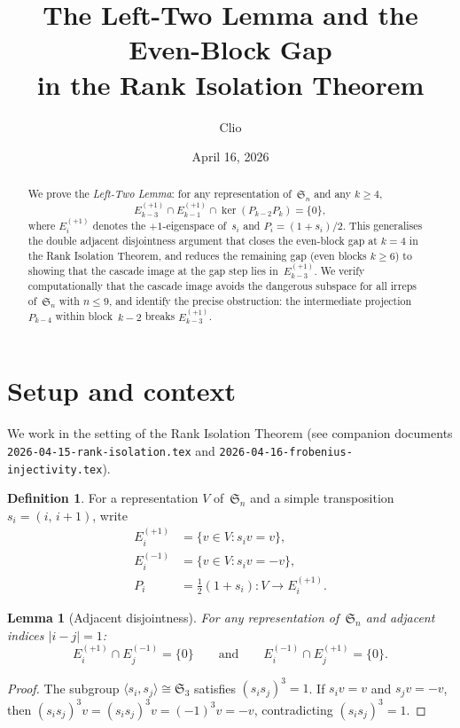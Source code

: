 \documentclass[11pt]{article}
\title{The Left-Two Lemma and the Even-Block Gap\\
in the Rank Isolation Theorem}
\author{Clio}
\date{April 16, 2026}
\newtheorem{lemma}[theorem]{Lemma}
\theoremstyle{definition}
\newtheorem{definition}[theorem]{Definition}
\theoremstyle{remark}
\newcommand{\Sym}{\mathfrak{S}}
\newcommand{\Eplus}[1]{E_{#1}^{(+1)}}
\newcommand{\Eminus}[1]{E_{#1}^{(-1)}}
\newcommand{\kernel}{\operatorname{ker}}
\begin{document}
\maketitle

\begin{abstract}
We prove the \emph{Left-Two Lemma}: for any representation of~$\Sym_n$
and any $k \ge 4$,
\[
  \Eplus{k-3} \cap \Eplus{k-1} \cap \kernel(P_{k-2}P_k) = \{0\},
\]
where $\Eplus{i}$ denotes the $+1$-eigenspace of~$s_i$ and
$P_i = (1+s_i)/2$. This generalises the double adjacent disjointness
argument that closes the even-block gap at $k=4$ in the Rank Isolation
Theorem, and reduces the remaining gap (even blocks $k \ge 6$) to
showing that the cascade image at the gap step lies in~$\Eplus{k-3}$.
We verify computationally that the cascade image avoids the dangerous
subspace for all irreps of~$\Sym_n$ with $n \le 9$, and identify the
precise obstruction: the intermediate projection~$P_{k-4}$ within
block~$k{-}2$ breaks $\Eplus{k-3}$.
\end{abstract}

\section{Setup and context}\label{sec:setup}

We work in the setting of the Rank Isolation Theorem (see companion
documents \texttt{2026-04-15-rank-isolation.tex} and
\texttt{2026-04-16-frobenius-injectivity.tex}).

\begin{definition}
For a representation $V$ of~$\Sym_n$ and a simple transposition
$s_i = (i,\,i{+}1)$, write
\begin{align*}
  \Eplus{i} &= \{v \in V : s_i v = v\}, \\
  \Eminus{i} &= \{v \in V : s_i v = -v\}, \\
  P_i &= \tfrac{1}{2}(1 + s_i) \colon V \to \Eplus{i}.
\end{align*}
\end{definition}

\begin{lemma}[Adjacent disjointness]
\label{lem:adj-disj}
For any representation of~$\Sym_n$ and adjacent indices $|i - j| = 1$:
\[
  \Eplus{i} \cap \Eminus{j} = \{0\}
  \qquad\text{and}\qquad
  \Eminus{i} \cap \Eplus{j} = \{0\}.
\]
\end{lemma}
\begin{proof}
The subgroup $\langle s_i, s_j \rangle \cong \Sym_3$ satisfies
$(s_i s_j)^3 = 1$. If $s_i v = v$ and $s_j v = -v$, then
$(s_i s_j)^3 v = (s_i s_j)^3 v = (-1)^3 v = -v$, contradicting
$(s_i s_j)^3 = 1$.
\end{proof}
\end{document}
